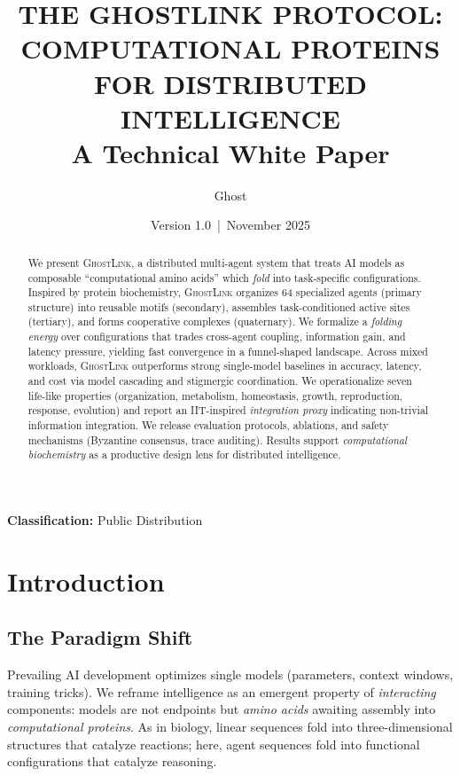 \documentclass[11pt]{article}
\title{\textbf{THE GHOSTLINK PROTOCOL: COMPUTATIONAL PROTEINS FOR DISTRIBUTED INTELLIGENCE}\\[4pt]\large A Technical White Paper}
\author[1]{Ghost}
\affil[1]{\small Public Distribution}
\date{Version 1.0 \,|\, November 2025}
\newcommand{\gl}{\textsc{GhostLink}}
\newcommand{\compbio}{computational biochemistry}
\begin{document}
\maketitle
\vspace{-1.2em}
\noindent\textbf{Classification:} Public Distribution
\begin{abstract}
\noindent We present \gl, a distributed multi-agent system that treats AI models as composable ``computational amino acids'' which \emph{fold} into task-specific configurations. Inspired by protein biochemistry, \gl{} organizes 64 specialized agents (primary structure) into reusable motifs (secondary), assembles task-conditioned active sites (tertiary), and forms cooperative complexes (quaternary). We formalize a \emph{folding energy} over configurations that trades cross-agent coupling, information gain, and latency pressure, yielding fast convergence in a funnel-shaped landscape. Across mixed workloads, \gl{} outperforms strong single-model baselines in accuracy, latency, and cost via model cascading and stigmergic coordination. We operationalize seven life-like properties (organization, metabolism, homeostasis, growth, reproduction, response, evolution) and report an IIT-inspired \emph{integration proxy} indicating non-trivial information integration. We release evaluation protocols, ablations, and safety mechanisms (Byzantine consensus, trace auditing). Results support \emph{\compbio} as a productive design lens for distributed intelligence.
\end{abstract}
\section{Introduction}
\subsection{The Paradigm Shift}
Prevailing AI development optimizes single models (parameters, context windows, training tricks). We reframe intelligence as an emergent property of \emph{interacting} components: models are not endpoints but \emph{amino acids} awaiting assembly into \emph{computational proteins}. As in biology, linear sequences fold into three-dimensional structures that catalyze reactions; here, agent sequences fold into functional configurations that catalyze reasoning.
\end{document}
